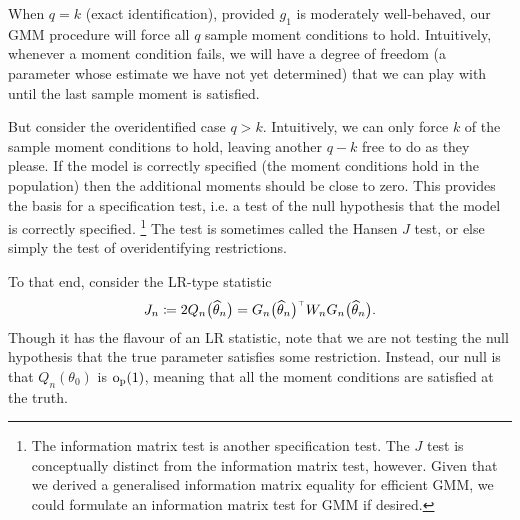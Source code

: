 \documentclass[11pt,letterpaper,reqno,oneside]{article}
\begin{document}
When $q=k$ (exact identification), provided $g_1$ is moderately well-behaved, our GMM procedure will force all $q$ sample moment conditions to hold. Intuitively, whenever a moment condition fails, we will have a degree of freedom (a parameter whose estimate we have not yet determined) that we can play with until the last sample moment is satisfied.

But consider the overidentified case $q>k$. Intuitively, we can only force $k$ of the sample moment conditions to hold, leaving another $q-k$ free to do as they please. If the model is correctly specified (the moment conditions hold in the population) then the additional moments should be close to zero. This provides the basis for a specification test, i.e. a test of the null hypothesis that the model is correctly specified.%
	\footnote{The information matrix test is another specification test. The $J$ test is conceptually distinct from the information matrix test, however. Given that we derived a generalised information matrix equality for efficient GMM, we could formulate an information matrix test for GMM if desired.}
The test is sometimes called the Hansen $J$ test, or else simply the test of overidentifying restrictions.


To that end, consider the LR-type statistic
%
\begin{equation*}
	J_n
	\coloneqq 2 Q_n\bigl( \widehat{\theta}_n \bigr) 
	= G_n\bigl( \widehat{\theta}_n \bigr)^{\scriptscriptstyle \top} 
	W_n G_n\bigl( \widehat{\theta}_n \bigr) .
\end{equation*}
%
Though it has the flavour of an LR statistic, note that we are not testing the null hypothesis that the true parameter satisfies some restriction. Instead, our null is that $Q_n(\theta_0)$ is $\mathrm{o}_{\mathrm{p}}(1)$, meaning that all the moment conditions are satisfied at the truth.
\end{document}
